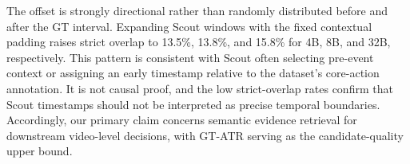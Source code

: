 The offset is strongly directional rather than randomly distributed before and after the GT interval. Expanding Scout windows with the fixed contextual padding raises strict overlap to 13.5\%, 13.8\%, and 15.8\% for 4B, 8B, and 32B, respectively. This pattern is consistent with Scout often selecting pre-event context or assigning an early timestamp relative to the dataset's core-action annotation. It is not causal proof, and the low strict-overlap rates confirm that Scout timestamps should not be interpreted as precise temporal boundaries. Accordingly, our primary claim concerns semantic evidence retrieval for downstream video-level decisions, with GT-ATR serving as the candidate-quality upper bound.

